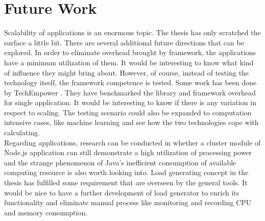 \chapter{Future Work}
Scalability of applications is an enormous topic. The thesis has only scratched the surface a little bit. There are several additional future directions that can be explored. In order to eliminate overhead brought by framework, the applications have a minimum utilization of them. It would be interesting to know what kind of influence they might bring about. However, of course, instead of testing the technology itself, the framework competence is tested. Some work has been done by TechEmpower \citep{benchmark}. They have benchmarked the library and framework overhead for single application. It would be interesting to know if there is any variation in respect to scaling. The testing scenario could also be expanded to computation intensive cases, like machine learning and see how the two technologies cope with calculating. \\
Regarding applications, research can be conducted in whether a cluster module of Node.js application can still demonstrate a high utilization of processing power and the strange phenomenon of Java's inefficient consumption of available computing resource is also worth looking into. Load generating concept in the thesis has fulfilled some requirement that are overseen by the general tools. It would be nice to have a further development of load generator to enrich its functionality and eliminate manual process like monitoring and recording CPU and memory consumption. \\